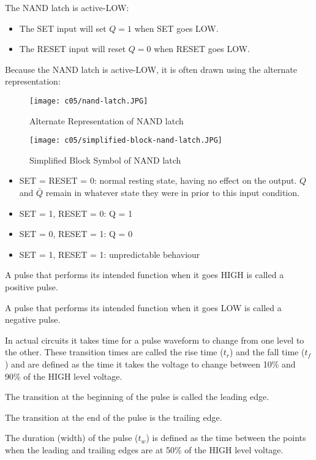   \par The NAND latch is active-LOW:
  \begin{itemize}
    \item The SET input will set $Q = 1$ when SET goes LOW.
    \item The RESET input will reset $Q = 0$ when RESET goes LOW.
  \end{itemize}
  \par Because the NAND latch is active-LOW, it is often drawn using the alternate
  representation:
  \begin{figure}[H]
    \centering
    \texttt{[image: c05/nand-latch.JPG]}
    \caption{Alternate Representation of NAND latch}
  \end{figure}
  \begin{figure}[H]
    \centering
    \texttt{[image: c05/simplified-block-nand-latch.JPG]}
    \caption{Simplified Block Symbol of NAND latch}
  \end{figure}


  \begin{itemize}
    \item SET = RESET = 0: normal resting state, having no effect on the output.
    $Q$ and $\bar{Q}$ remain in whatever state they were in prior to this input
    condition.
    \item SET = 1, RESET = 0: Q = 1
    \item SET = 0, RESET = 1: Q = 0
    \item SET = 1, RESET = 1: unpredictable behaviour
  \end{itemize}

  \par A pulse that performs its intended function when it goes HIGH is called
  a positive pulse.
  \par A pulse that performs its intended function when it goes LOW is called
  a negative pulse.
  \par In actual circuits it takes time for a pulse waveform to change from one
  level to the other. These transition times are called the rise time ($t_{r}$) and
  the fall time ($t_{f}$) and are defined as the time it takes the voltage to change
  between 10\% and 90\% of the HIGH level voltage.
  \par The transition at the beginning of the pulse is called the leading edge.
  \par The transition at the end of the pulse is the trailing edge.
  \par The duration (width) of the pulse ($t_{w}$) is defined as the time between
  the points when the leading and trailing edges are at 50\% of the HIGH level voltage.

